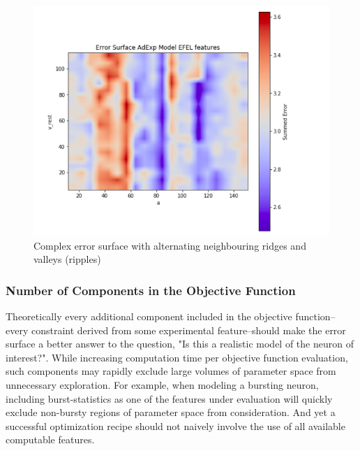 \begin{figure}
    \centering
    \includegraphics[scale=1.25]{figures/third_error_surface.png}
        \caption[Complex but not hopeless error surfaces]{Complex error surface with alternating neighbouring ridges and valleys (ripples)}
    \label{fig:real_problem_nontrivial_surface}
\end{figure}





\subsubsection{Number of Components in the Objective Function}
Theoretically every additional component included in the objective function--every constraint derived from some experimental feature--should make the error surface a better answer to the question, "Is this a realistic model of the neuron of interest?".
While increasing computation time per objective function evaluation, such components may rapidly exclude large volumes of parameter space from unnecessary exploration.
For example, when modeling a bursting neuron, including burst-statistics as one of the features under evaluation will quickly exclude non-bursty regions of parameter space from consideration.
And yet a successful optimization recipe should not naively involve the use of all available computable features.


